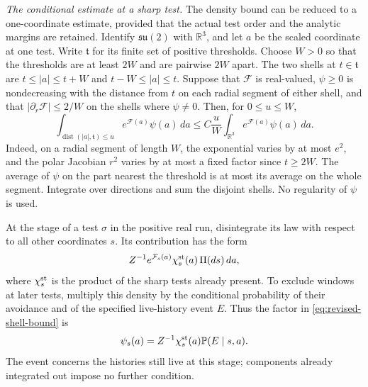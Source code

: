 \documentclass[11pt,letterpaper,reqno]{amsart}
\theoremstyle{definition}
\theoremstyle{remark}
\newcommand{\R}{\mathbb R}
\begin{document}
\emph{The conditional estimate at a sharp test.}
The density bound can be reduced to a one-coordinate estimate,
provided that the actual test order and the analytic margins are
retained. Identify $\mathfrak{su}(2)$ with $\R^3$, and let
$a$ be the scaled coordinate at one test. Write $\mathfrak t$
for its finite set of positive thresholds. Choose $W>0$ so that
the thresholds are at least $2W$ and are pairwise $2W$ apart.
The two shells at $t\in\mathfrak t$ are
$t\le|a|\le t+W$ and $t-W\le|a|\le t$.
Suppose that $\mathcal F$ is real-valued, $\psi\ge0$ is nondecreasing with the distance
from $t$ on each radial segment of either shell, and that
$|\partial_r\mathcal F|\le2/W$ on the shells where
$\psi\ne0$. Then, for $0\le u\le W$,
\begin{equation}\label{eq:revised-shell-bound}
 \int_{\operatorname{dist}(|a|,\mathfrak t)\le u}
                  e^{\mathcal F(a)}\psi(a)\,da
 \le C\frac uW\int_{\R^3}e^{\mathcal F(a)}\psi(a)\,da.
\end{equation}
Indeed, on a radial segment of length $W$, the exponential
varies by at most $e^2$, and the polar Jacobian $r^2$ varies
by at most a fixed factor since $t\ge2W$. The average of
$\psi$ on the part nearest the threshold is at most its
average on the whole segment. Integrate over directions and
sum the disjoint shells. No regularity of $\psi$ is used.

At the stage of a test $\sigma$ in the positive real run,
disintegrate its law with respect to all other coordinates $s$. Its contribution
has the form
\[
 Z^{-1}e^{\mathcal F_s(a)}\chi_s^{\rm st}(a)\,\Pi(ds)\,da,
\]
where $\chi_s^{\rm st}$ is the product of the sharp tests
already present. To exclude windows at later tests, multiply
this density by the conditional probability of their avoidance
and of the specified live-history event $E$. Thus the factor
in \eqref{eq:revised-shell-bound} is
\[
 \psi_s(a)=Z^{-1}\chi_s^{\rm st}(a)
                         \mathbb P(E\mid s,a).
\]
The event concerns the histories still live at this stage;
components already integrated out impose no further condition.
\end{document}
